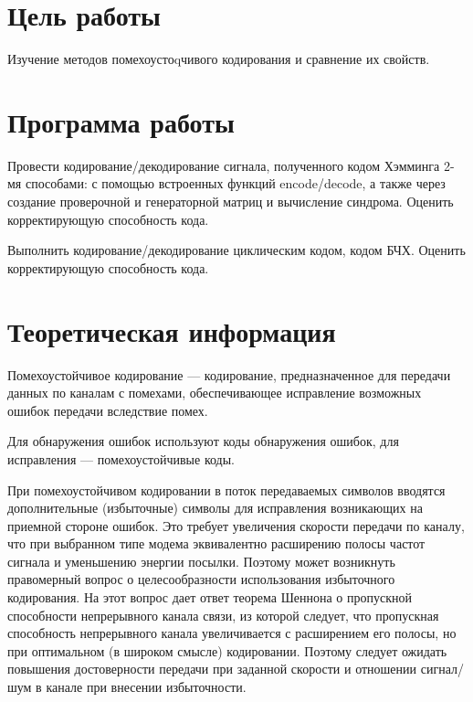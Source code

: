 







\section{Цель работы}
Изучение методов помехоустоqчивого кодирования и сравнение их свойств.

\section{Программа работы}
Провести кодирование/декодирование сигнала, полученного кодом Хэмминга 2-мя способами: с помощью встроенных функций encode/decode, а также через создание проверочной и генераторной матриц и вычисление синдрома. Оценить корректирующую способность кода.

Выполнить кодирование/декодирование циклическим кодом, кодом БЧХ. Оценить корректирующую способность кода.

\section{Теоретическая информация}
Помехоустойчивое кодирование — кодирование, предназначенное для передачи данных по каналам с помехами, обеспечивающее исправление возможных ошибок передачи вследствие помех.

Для обнаружения ошибок используют коды обнаружения ошибок, для исправления — помехоустойчивые коды.

При помехоустойчивом кодировании в поток передаваемых символов вводятся дополнительные (избыточные) символы для исправления возникающих на приемной стороне ошибок. Это требует увеличения скорости передачи по каналу, что при выбранном типе модема эквивалентно расширению полосы частот сигнала и уменьшению энергии посылки. Поэтому может возникнуть правомерный вопрос о целесообразности использования избыточного кодирования. На этот вопрос дает ответ теорема Шеннона о пропускной способности непрерывного канала связи, из которой следует, что пропускная способность непрерывного канала увеличивается с расширением его полосы, но при оптимальном (в широком смысле) кодировании. Поэтому следует ожидать повышения достоверности передачи при заданной скорости и отношении сигнал/шум в канале при внесении избыточности.

